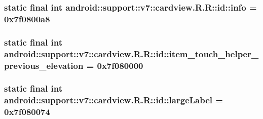 \hypertarget{classandroid_1_1support_1_1v7_1_1cardview_1_1_r_1_1id_7b184e021b5ffc345606ae1a8d405c55}{
\subsubsection[{info}]{\setlength{\rightskip}{0pt plus 5cm}static final int android::support::v7::cardview.R.R::id::info = 0x7f0800a8}}
\label{classandroid_1_1support_1_1v7_1_1cardview_1_1_r_1_1id_7b184e021b5ffc345606ae1a8d405c55}


\hypertarget{classandroid_1_1support_1_1v7_1_1cardview_1_1_r_1_1id_1adeb3cdb74947a0912214033694a2ab}{
\subsubsection[{item\_\-touch\_\-helper\_\-previous\_\-elevation}]{\setlength{\rightskip}{0pt plus 5cm}static final int android::support::v7::cardview.R.R::id::item\_\-touch\_\-helper\_\-previous\_\-elevation = 0x7f080000}}
\label{classandroid_1_1support_1_1v7_1_1cardview_1_1_r_1_1id_1adeb3cdb74947a0912214033694a2ab}


\hypertarget{classandroid_1_1support_1_1v7_1_1cardview_1_1_r_1_1id_42806005bbd9f253f25d3561e0d127a1}{
\subsubsection[{largeLabel}]{\setlength{\rightskip}{0pt plus 5cm}static final int android::support::v7::cardview.R.R::id::largeLabel = 0x7f080074}}
\label{classandroid_1_1support_1_1v7_1_1cardview_1_1_r_1_1id_42806005bbd9f253f25d3561e0d127a1}


